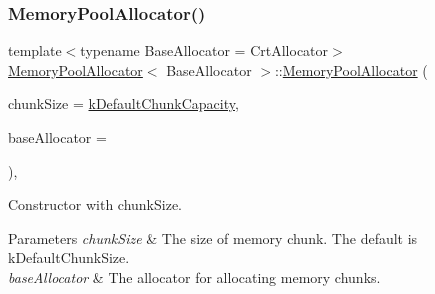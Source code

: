 \subsubsection{\texorpdfstring{Memory\+Pool\+Allocator()}{MemoryPoolAllocator()}\hspace{0.1cm}{\footnotesize\ttfamily [1/3]}}
{\footnotesize\ttfamily template$<$typename Base\+Allocator = Crt\+Allocator$>$ \\
\hyperlink{classMemoryPoolAllocator}{Memory\+Pool\+Allocator}$<$ Base\+Allocator $>$\+::\hyperlink{classMemoryPoolAllocator}{Memory\+Pool\+Allocator} (\begin{DoxyParamCaption}\item[{size\+\_\+t}]{chunk\+Size = {\ttfamily \hyperlink{classMemoryPoolAllocator_a8d9337bc406a25dd06a24ee3fa5fb58c}{k\+Default\+Chunk\+Capacity}},  }\item[{Base\+Allocator $\ast$}]{base\+Allocator = {} }\end{DoxyParamCaption})\hspace{0.3cm}{\ttfamily [inline]}, {\ttfamily [explicit]}}



Constructor with chunk\+Size. 


\begin{DoxyParams}{Parameters}
{\em chunk\+Size} & The size of memory chunk. The default is k\+Default\+Chunk\+Size. \\
\hline
{\em base\+Allocator} & The allocator for allocating memory chunks. \\
\hline
\end{DoxyParams}
\mbox{\label{classMemoryPoolAllocator_a1f0d865093fdb955d956b7a445a8ddbf}} 
